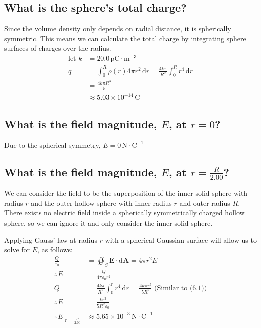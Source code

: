 \documentclass[a4paper]{scrartcl}
\begin{document}
\subsection{What is the sphere's total charge?}
Since the volume density only depends on radial distance, it is spherically symmetric. This means we can calculate the total charge by integrating sphere surfaces of charges over the radius.
\begin{align*}
    \text{let } k &= 20.0\,\mathrm{pC \cdot m^{-3}} \\
    q &= \int_0^R \rho(r) 4 \pi r^2 \, \mathrm{d}r = \frac{4 k \pi}{R^2} \int_0^R r^4 \, \mathrm{d}r \\
    &= \frac{4 k \pi R^3}{5} \\
    &\approx 5.03 \times 10^{-14}\,\mathrm{C}
\end{align*}

\subsection{What is the field magnitude, \(E\), at \(r = 0\)?}
Due to the spherical symmetry, \(E = 0\,\mathrm{N \cdot C^{-1}}\)

\subsection{What is the field magnitude, \(E\), at \(r = \frac{R}{2.00}\)?}
We can consider the field to be the superposition of the inner solid sphere with radius \(r\) and the outer hollow sphere with inner radius \(r\) and outer radius \(R\). There exists no electric field inside a spherically symmetrically charged hollow sphere, so we can ignore it and only consider the inner solid sphere.

Applying Gauss' law at radius \(r\) with a spherical Gaussian surface will allow us to solve for \(E\), as follows:
\begin{align*}
    \frac{Q}{\varepsilon_0} &= \oiint_S \mathbf{E} \cdot \mathrm{d}\mathbf{A} = 4 \pi r^2 E \\
    \therefore E &= \frac{Q}{4 \pi \varepsilon_0 r^2} \\
    Q &= \frac{4 k \pi}{R^2} \int_0^r r^4 \, \mathrm{d}r = \frac{4 k \pi r^5}{5 R^2} \text{ (Similar to (6.1))} \\
    \therefore E &= \frac{k r^3}{5 R^2 \varepsilon_0} \\
    \therefore E\bigg|_{r=\frac{R}{2.00}} &\approx 5.65 \times 10^{-3}\,\mathrm{N \cdot C^{-1}}
\end{align*}
\end{document}
